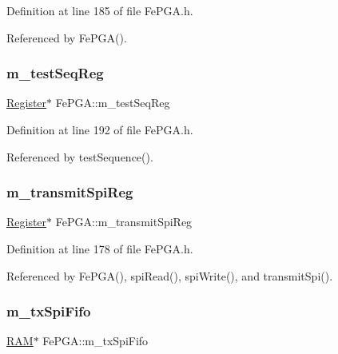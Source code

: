 Definition at line 185 of file Fe\+P\+G\+A.\+h.



Referenced by Fe\+P\+G\+A().

\mbox{\label{classFePGA_a67bc3c8f923b673100974fd86096393e}} 
\subsubsection{\texorpdfstring{m\+\_\+test\+Seq\+Reg}{m\_testSeqReg}}
{\footnotesize\ttfamily \hyperlink{classRegister}{Register}$\ast$ Fe\+P\+G\+A\+::m\+\_\+test\+Seq\+Reg\hspace{0.3cm}{\ttfamily [private]}}



Definition at line 192 of file Fe\+P\+G\+A.\+h.



Referenced by test\+Sequence().

\mbox{\label{classFePGA_a003ee241fb5f32fb3442174db3fe6f49}} 
\subsubsection{\texorpdfstring{m\+\_\+transmit\+Spi\+Reg}{m\_transmitSpiReg}}
{\footnotesize\ttfamily \hyperlink{classRegister}{Register}$\ast$ Fe\+P\+G\+A\+::m\+\_\+transmit\+Spi\+Reg\hspace{0.3cm}{\ttfamily [private]}}



Definition at line 178 of file Fe\+P\+G\+A.\+h.



Referenced by Fe\+P\+G\+A(), spi\+Read(), spi\+Write(), and transmit\+Spi().

\mbox{\label{classFePGA_a5b3e4deb73a882e6f044450d8a733558}} 
\subsubsection{\texorpdfstring{m\+\_\+tx\+Spi\+Fifo}{m\_txSpiFifo}}
{\footnotesize\ttfamily \hyperlink{classRAM}{R\+AM}$\ast$ Fe\+P\+G\+A\+::m\+\_\+tx\+Spi\+Fifo\hspace{0.3cm}{\ttfamily [private]}}



